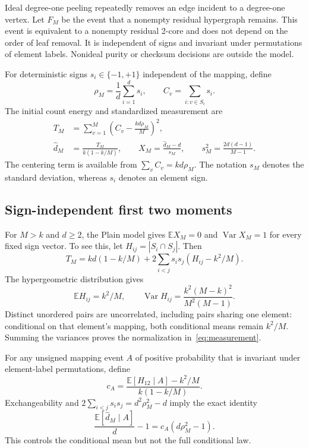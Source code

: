 \documentclass[11pt,a4paper]{article}
\newcommand{\E}{\mathbb E}
\newcommand{\Var}{\operatorname{Var}}
\begin{document}
Ideal degree-one peeling repeatedly removes an edge incident to a degree-one vertex. Let $F_M$ be the event that a nonempty residual hypergraph remains. This event is equivalent to a nonempty residual 2-core and does not depend on the order of leaf removal. It is independent of signs and invariant under permutations of element labels. Nonideal purity or checksum decisions are outside the model.

For deterministic signs $s_i\in\{-1,+1\}$ independent of the mapping, define
\begin{equation}
\rho_M=\frac1d\sum_{i=1}^d s_i,\qquad C_v=\sum_{i:v\in S_i}s_i.
\end{equation}
The initial count energy and standardized measurement are
\begin{align}
T_M&=\sum_{v=1}^M\left(C_v-\frac{kd\rho_M}{M}\right)^2,\label{eq:energy}\\
\widehat d_M&=\frac{T_M}{k(1-k/M)},\qquad X_M=\frac{\widehat d_M-d}{s_M},
\qquad s_M^2=\frac{2d(d-1)}{M-1}.\label{eq:measurement}
\end{align}
The centering term is available from $\sum_v C_v=kd\rho_M$. The notation $s_M$ denotes the standard deviation, whereas $s_i$ denotes an element sign.

\subsection{Sign-independent first two moments}
For $M>k$ and $d\ge2$, the Plain model gives $\E X_M=0$ and $\Var X_M=1$ for every fixed sign vector. To see this, let $H_{ij}=|S_i\cap S_j|$. Then
\begin{equation}
T_M=kd(1-k/M)+2\sum_{i<j}s_is_j(H_{ij}-k^2/M).
\end{equation}
The hypergeometric distribution gives
\begin{equation}
\E H_{ij}=k^2/M,\qquad
\Var H_{ij}=\frac{k^2(M-k)^2}{M^2(M-1)}.
\end{equation}
Distinct unordered pairs are uncorrelated, including pairs sharing one element: conditional on that element's mapping, both conditional means remain $k^2/M$. Summing the variances proves the normalization in~\eqref{eq:measurement}.

For any unsigned mapping event $A$ of positive probability that is invariant under element-label permutations, define
\begin{equation}
c_A=\frac{\E[H_{12}\mid A]-k^2/M}{k(1-k/M)}.
\end{equation}
Exchangeability and $2\sum_{i<j}s_is_j=d^2\rho_M^2-d$ imply the exact identity
\begin{equation}
\frac{\E[\widehat d_M\mid A]}d-1=c_A(d\rho_M^2-1).\label{eq:projection}
\end{equation}
This controls the conditional mean but not the full conditional law.
\end{document}
